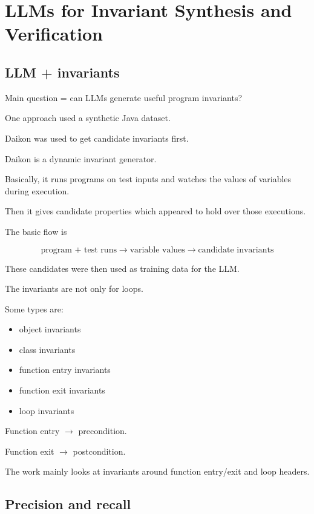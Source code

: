 \documentclass[11pt]{book}
\begin{document}
\setcounter{chapter}{3}
\chapter{LLMs for Invariant Synthesis and Verification}

\section{LLM + invariants}

Main question = can LLMs generate useful program
invariants?

One approach used a synthetic Java dataset.

Daikon was used to get candidate invariants first.

\begin{ppdefn}
Daikon is a dynamic invariant generator.

Basically, it runs programs on test inputs and watches
the values of variables during execution.

Then it gives candidate properties which appeared to
hold over those executions.
\end{ppdefn}

The basic flow is

\[
\text{program + test runs}
\rightarrow
\text{variable values}
\rightarrow
\text{candidate invariants}
\]

These candidates were then used as training data
for the LLM.

The invariants are not only for loops.

Some types are:

\begin{itemize}
    \item object invariants
    \item class invariants
    \item function entry invariants
    \item function exit invariants
    \item loop invariants
\end{itemize}

Function entry $\rightarrow$ precondition.

Function exit $\rightarrow$ postcondition.

The work mainly looks at invariants around function
entry/exit and loop headers.

\section{Precision and recall}
\end{document}

